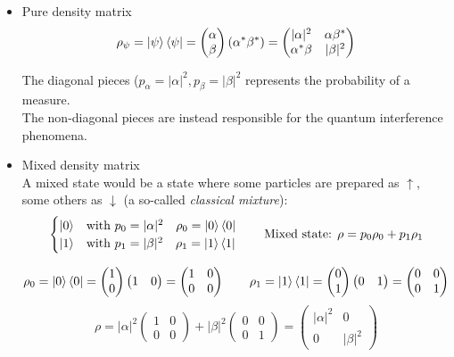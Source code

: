 \begin{itemize}
    \item Pure density matrix
$$ \rho_\psi = \left|\psi\right\rangle\left\langle\psi\right| = \begin{pmatrix}\alpha\\\beta\end{pmatrix} \left(\alpha^* \beta^*\right) = \begin{pmatrix}
    |\alpha|^2 & \alpha \beta^* \\ \alpha^* \beta & |\beta|^2
\end{pmatrix}$$

The diagonal pieces ($p_\alpha = |\alpha|^2, p_\beta = |\beta|^2$ represents the probability of a measure.\\
The non-diagonal pieces are instead responsible for the quantum interference phenomena.

\item Mixed density matrix\\
A mixed state would be a state where some particles are prepared as $\uparrow$, some others as $\downarrow$ (a so-called \textit{classical mixture}):
$$\begin{cases}
\left|0\right\rangle & \text{with } p_0 = |\alpha|^2 \quad \rho_0 = \left|0\right\rangle\left\langle0\right|\\
\left|1\right\rangle & \text{with } p_1 = |\beta|^2 \quad \rho_1 = \left|1\right\rangle\left\langle1\right|
\end{cases} \qquad \text{Mixed state: } \rho = p_0\rho_0 + p_1\rho_1$$

$$\rho_0 = \left|0\right\rangle\left\langle0\right| = \begin{pmatrix}1\\0\end{pmatrix} \begin{pmatrix}1&0\end{pmatrix} = \begin{pmatrix}1&0\\0&0\end{pmatrix} \qquad \rho_1 = \left|1\right\rangle\left\langle1\right| = \begin{pmatrix}0\\1\end{pmatrix} \begin{pmatrix}0&1\end{pmatrix} = \begin{pmatrix}0&0\\0&1\end{pmatrix}$$
$$\rho = |\alpha|^2\begin{pmatrix}1&0\\0&0\end{pmatrix} + |\beta|^2\begin{pmatrix}0&0\\0&1\end{pmatrix} = \begin{pmatrix}|\alpha|^2&0\\0&|\beta|^2\end{pmatrix}$$
\end{itemize}

